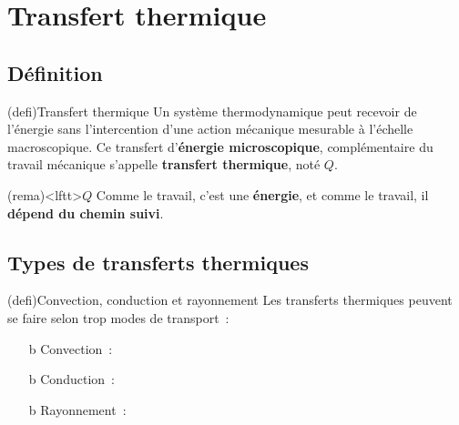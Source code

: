 \documentclass[../../main/main.tex]{subfiles}
\begin{document}
\section{Transfert thermique}
\label{sec:transtherm}
\subsection{Définition}
\begin{tcb*}(defi){Transfert thermique}
	Un système thermodynamique peut recevoir de l'énergie sans l'intercention
	d'une action mécanique mesurable à l'échelle macroscopique. Ce transfert
	d'\textbf{énergie microscopique}, complémentaire du travail mécanique s'appelle
	\textbf{transfert thermique}, noté $Q$.
\end{tcb*}

\begin{tcb}(rema)<lftt>{$Q$}
	Comme le travail, c'est une \textbf{énergie}, et comme le travail, il
	\textbf{dépend du chemin suivi}.
\end{tcb}
\subsection{Types de transferts thermiques}
\begin{tcb}(defi){Convection, conduction et rayonnement}
	Les transferts thermiques peuvent se faire selon trop modes de transport~:
	\begin{itemize}
		\item[b]{Convection}~: 
		\item[b]{Conduction}~: 
		\item[b]{Rayonnement}~: 
	\end{itemize}
\end{tcb}
\end{document}

